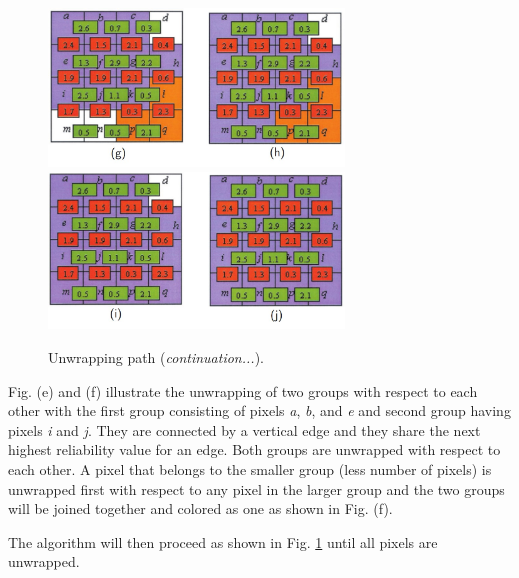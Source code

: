 \captionsetup[figure]{width=6in}
\begin{figure}[h!]
	\centering
	\includegraphics[width=0.7\textwidth]{figures/unwrap4.jpg}
	\includegraphics[width=0.7\textwidth]{figures/unwrap5.jpg}
	\caption[Continuation of unwrapping path]{Unwrapping path (\textit{continuation...}).}
	\label{fig:unwrap1}
\end{figure}

Fig. (e) and (f) illustrate the unwrapping of two groups with respect to each other with the first group consisting of pixels \textit{a}, \textit{b}, and \textit{e} and second group having pixels \textit{i} and \textit{j}. They are connected by a vertical edge and they share the next highest reliability value for an edge. Both groups are unwrapped with respect to each other. A pixel that belongs to the smaller group (less number of pixels) is unwrapped first with respect to any pixel in the larger group and the two groups will be joined together and colored as one as shown in Fig. (f). 

The algorithm will then proceed as shown in Fig. \ref{fig:unwrap1} until all pixels are unwrapped.

